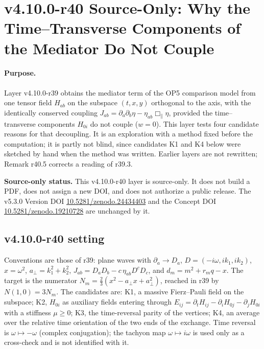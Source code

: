 \clearpage
\section*{v4.10.0-r40 Source-Only: Why the Time--Transverse Components of the Mediator Do Not Couple}
\label{sec:v4100-r40-h0i-decoupling}

\paragraph{Purpose.}
Layer v4.10.0-r39 obtains the mediator term of the OP5 comparison model from one tensor field \(H_{ab}\) on the subspace \((t,x,y)\) orthogonal to the
axis, with the identically conserved coupling \(J_{ab}=\partial_a\partial_b\eta-\eta_{ab}\Box_\parallel\eta\), provided the time--transverse components \(H_{0i}\)
do not couple (\(w=0\)).  This layer tests four candidate reasons for that decoupling.  It is an exploration with a method fixed before the
computation; it is partly not blind, since candidates K1 and K4 below were sketched by hand when the method was written.  Earlier layers are
not rewritten; Remark r40.5 corrects a reading of r39.3.

\noindent\textbf{Source-only status.}
This v4.10.0-r40 layer is source-only.  It does not build a PDF, does not assign a new DOI,
and does not authorize a public release.  The v5.3.0 Version DOI
\href{https://doi.org/10.5281/zenodo.24434403}{10.5281/zenodo.24434403} and the Concept DOI
\href{https://doi.org/10.5281/zenodo.19210728}{10.5281/zenodo.19210728} are unchanged by it.

\subsection*{v4.10.0-r40 setting}
\label{subsec:v4100-r40-setting}

Conventions are those of r39: plane waves with \(\partial_a\to D_a\), \(D=(-i\omega,ik_1,ik_2)\), \(x=\omega^2\), \(a_\perp=k_1^2+k_2^2\),
\(J_{ab}=D_aD_b-c\,\eta_{ab}D^cD_c\), and \(d_m=m^2+r_mq-x\).  The target is the numerator \(N_m=\tfrac23(x^2-a_\perp x+a_\perp^2)\), reached in r39 by
\(N(1,0)=3N_m\).  The candidates are: K1, a massive Fierz--Pauli field on the subspace; K2, \(H_{0i}\) as auxiliary fields entering through
\(E_{ij}=\partial_tH_{ij}-\partial_iH_{0j}-\partial_jH_{0i}\) with a stiffness \(\mu\ge0\); K3, the time-reversal parity of the vertices; K4, an average over
the relative time orientation of the two ends of the exchange.  Time reversal is \(\omega\mapsto-\omega\) (complex conjugation); the tachyon map
\(\omega\mapsto i\omega\) is used only as a cross-check and is not identified with it.

